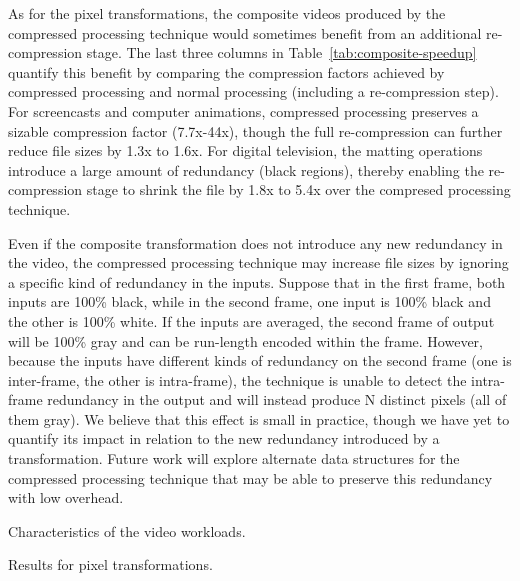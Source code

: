 As for the pixel transformations, the composite videos produced by the
compressed processing technique would sometimes benefit from an
additional re-compression stage.  The last three columns in
Table~\ref{tab:composite-speedup} quantify this benefit by comparing
the compression factors achieved by compressed processing and normal
processing (including a re-compression step).  For screencasts and
computer animations, compressed processing preserves a sizable
compression factor (7.7x-44x), though the full re-compression can
further reduce file sizes by 1.3x to 1.6x.  For digital television,
the matting operations introduce a large amount of redundancy (black
regions), thereby enabling the re-compression stage to shrink the file
by 1.8x to 5.4x over the compresed processing technique.

Even if the composite transformation does not introduce any new
redundancy in the video, the compressed processing technique may
increase file sizes by ignoring a specific kind of redundancy in the
inputs.  Suppose that in the first frame, both inputs are 100\% black,
while in the second frame, one input is 100\% black and the other is
100\% white.  If the inputs are averaged, the second frame of output
will be 100\% gray and can be run-length encoded within the frame.
However, because the inputs have different kinds of redundancy on the
second frame (one is inter-frame, the other is intra-frame), the
technique is unable to detect the intra-frame redundancy in the output
and will instead produce N distinct pixels (all of them gray).  We
believe that this effect is small in practice, though we have yet to
quantify its impact in relation to the new redundancy introduced by a
transformation.  Future work will explore alternate data structures
for the compressed processing technique that may be able to preserve
this redundancy with low overhead.


\begin{table*}[t]
\caption{Characteristics of the video workloads.
\protect\label{tab:videos}}
\end{table*}

\begin{table*}[t]
\caption{Results for pixel transformations.
\protect\label{tab:pixel-speedup}}
\end{table*}

